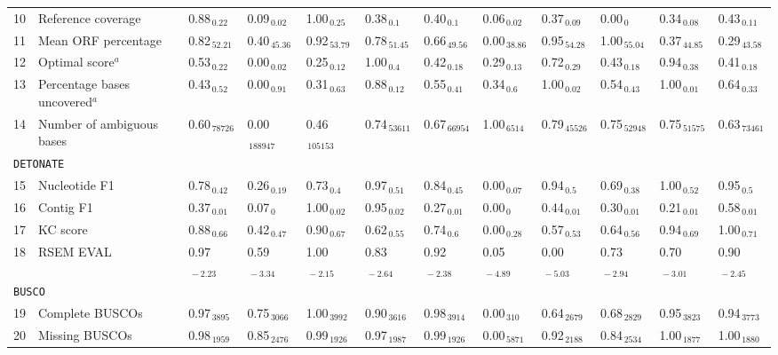 \documentclass{scrartcl}
\begin{document}
\begin{landscape}
\begin{table}
\begin{scriptsize}
\begin{tabular}{llllllllllll}
10 & Reference coverage  & 0.88$_{\,0.22}$ & 0.09$_{\,0.02}$ & 1.00$_{\,0.25}$ & 0.38$_{\,0.1}$ & 0.40$_{\,0.1}$ & 0.06$_{\,0.02}$ & 0.37$_{\,0.09}$ & 0.00$_{\,0}$ & 0.34$_{\,0.08}$ & 0.43$_{\,0.11}$ \\11 & Mean ORF percentage  & 0.82$_{\,52.21}$ & 0.40$_{\,45.36}$ & 0.92$_{\,53.79}$ & 0.78$_{\,51.45}$ & 0.66$_{\,49.56}$ & 0.00$_{\,38.86}$ & 0.95$_{\,54.28}$ & 1.00$_{\,55.04}$ & 0.37$_{\,44.85}$ & 0.29$_{\,43.58}$ \\12 & Optimal score$^{a}$  & 0.53$_{\,0.22}$ & 0.00$_{\,0.02}$ & 0.25$_{\,0.12}$ & 1.00$_{\,0.4}$ & 0.42$_{\,0.18}$ & 0.29$_{\,0.13}$ & 0.72$_{\,0.29}$ & 0.43$_{\,0.18}$ & 0.94$_{\,0.38}$ & 0.41$_{\,0.18}$ \\13 & Percentage bases uncovered$^{a}$  & 0.43$_{\,0.52}$ & 0.00$_{\,0.91}$ & 0.31$_{\,0.63}$ & 0.88$_{\,0.12}$ & 0.55$_{\,0.41}$ & 0.34$_{\,0.6}$ & 1.00$_{\,0.02}$ & 0.54$_{\,0.43}$ & 1.00$_{\,0.01}$ & 0.64$_{\,0.33}$ \\14 & Number of ambiguous bases  & 0.60$_{\,78726}$ & 0.00$_{\,188947}$ & 0.46$_{\,105153}$ & 0.74$_{\,53611}$ & 0.67$_{\,66954}$ & 1.00$_{\,6514}$ & 0.79$_{\,45526}$ & 0.75$_{\,52948}$ & 0.75$_{\,51575}$ & 0.63$_{\,73461}$ \\\midrule
\multicolumn{11}{l}{\texttt{DETONATE}}\\ 
\midrule
15 & Nucleotide F1  & 0.78$_{\,0.42}$ & 0.26$_{\,0.19}$ & 0.73$_{\,0.4}$ & 0.97$_{\,0.51}$ & 0.84$_{\,0.45}$ & 0.00$_{\,0.07}$ & 0.94$_{\,0.5}$ & 0.69$_{\,0.38}$ & 1.00$_{\,0.52}$ & 0.95$_{\,0.5}$ \\16 & Contig F1  & 0.37$_{\,0.01}$ & 0.07$_{\,0}$ & 1.00$_{\,0.02}$ & 0.95$_{\,0.02}$ & 0.27$_{\,0.01}$ & 0.00$_{\,0}$ & 0.44$_{\,0.01}$ & 0.30$_{\,0.01}$ & 0.21$_{\,0.01}$ & 0.58$_{\,0.01}$ \\17 & KC score  & 0.88$_{\,0.66}$ & 0.42$_{\,0.47}$ & 0.90$_{\,0.67}$ & 0.62$_{\,0.55}$ & 0.74$_{\,0.6}$ & 0.00$_{\,0.28}$ & 0.57$_{\,0.53}$ & 0.64$_{\,0.56}$ & 0.94$_{\,0.69}$ & 1.00$_{\,0.71}$ \\18 & RSEM EVAL  & 0.97$_{\,-2.23}$ & 0.59$_{\,-3.34}$ & 1.00$_{\,-2.15}$ & 0.83$_{\,-2.64}$ & 0.92$_{\,-2.38}$ & 0.05$_{\,-4.89}$ & 0.00$_{\,-5.03}$ & 0.73$_{\,-2.94}$ & 0.70$_{\,-3.01}$ & 0.90$_{\,-2.45}$ \\\midrule
\multicolumn{11}{l}{\texttt{BUSCO}}\\ 
\midrule
19 & Complete BUSCOs  & 0.97$_{\,3895}$ & 0.75$_{\,3066}$ & 1.00$_{\,3992}$ & 0.90$_{\,3616}$ & 0.98$_{\,3914}$ & 0.00$_{\,310}$ & 0.64$_{\,2679}$ & 0.68$_{\,2829}$ & 0.95$_{\,3823}$ & 0.94$_{\,3773}$ \\20 & Missing BUSCOs  & 0.98$_{\,1959}$ & 0.85$_{\,2476}$ & 0.99$_{\,1926}$ & 0.97$_{\,1987}$ & 0.99$_{\,1926}$ & 0.00$_{\,5871}$ & 0.92$_{\,2188}$ & 0.84$_{\,2534}$ & 1.00$_{\,1877}$ & 1.00$_{\,1880}$ \\\midrule

\end{tabular}
\end{scriptsize}
\end{table}
\end{landscape}
\end{document}
